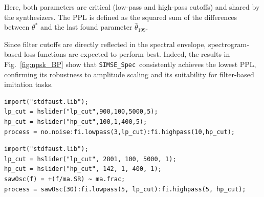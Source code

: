 \documentclass[runningheads]{llncs}
\newcommand{\SIMSESpec}{\texttt{SIMSE\_Spec}\xspace}
\newcommand{\BPNoise}{\textbf{BP-Noise}\xspace}
\newcommand{\BPSaw}{\textbf{BP-Saw}\xspace}
\begin{document}
Here, both parameters are critical (low-pass and high-pass cutoffs) and shared by the synthesizers. The PPL is defined as the squared sum of the differences between $\theta^*$ and the last found parameter $\hat{\theta}_{199}$.

Since filter cutoffs are directly reflected in the spectral envelope, spectrogram-based loss functions are expected to perform best.  
Indeed, the results in Fig.~\ref{fig:npsk_BP} show that \SIMSESpec\ consistently achieves the lowest PPL, confirming its robustness to amplitude scaling and its suitability for filter-based imitation tasks.

\begin{lstlisting}[caption={\BPNoise}, label={lst:program0}, language=Faust,
float, floatplacement=!H, xleftmargin=1em, xrightmargin=0.5em, firstnumber=0, aboveskip=0em, belowskip=-1em]
import("stdfaust.lib");
lp_cut = hslider("lp_cut",900,100,5000,5);
hp_cut = hslider("hp_cut",100,1,400,5);
process = no.noise:fi.lowpass(3,lp_cut):fi.highpass(10,hp_cut);
\end{lstlisting}

\begin{lstlisting}[caption={\BPSaw}, label={lst:program0_saw}, language=Faust,
float, floatplacement=!H, xleftmargin=1em, xrightmargin=0.5em, firstnumber=0, aboveskip=0em, belowskip=-1em]
import("stdfaust.lib");
lp_cut = hslider("lp_cut", 2801, 100, 5000, 1);
hp_cut = hslider("hp_cut", 142, 1, 400, 1);
sawOsc(f) = +(f/ma.SR) ~ ma.frac;
process = sawOsc(30):fi.lowpass(5, lp_cut):fi.highpass(5, hp_cut);
\end{lstlisting}
\end{document}
